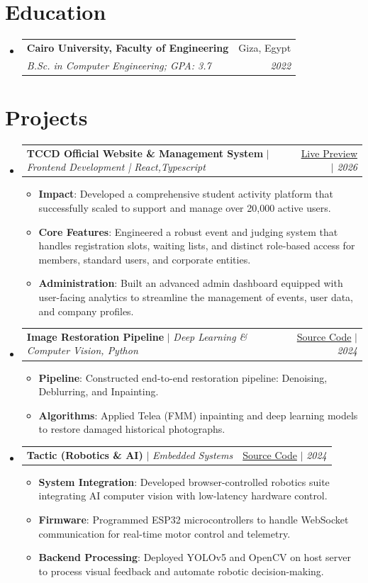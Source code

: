 \documentclass[letterpaper,10pt]{article}
\makeatletter
\newcommand{\resumeItem}[2]{\item\footnotesize{\textbf{#1}{: #2 \vspace{-3pt}}}}
\newcommand{\resumeSubheading}[4]{
  \vspace{-1pt}\item
    \begin{tabular*}{1.0\textwidth}{l@{\extracolsep{\fill}}r}
      \textbf{#1} & #2 \\
      \textit{\footnotesize#3} & \textit{\footnotesize #4} \\
    \end{tabular*}\vspace{-7pt}
}
\newcommand{\resumeProjectSubheading}[3]{
  \vspace{-1pt}\item
    \begin{tabular*}{1.0\textwidth}{l@{\extracolsep{\fill}}r}
      \textbf{#1} $|$ \textit{\footnotesize#2} & #3 \\
    \end{tabular*}\vspace{-7pt}
}
\newcommand{\resumeSubHeadingListStart}{\begin{itemize}[leftmargin=*]}
\newcommand{\resumeSubHeadingListEnd}{\end{itemize}}
\newcommand{\resumeItemListStart}{\begin{itemize}}
\newcommand{\resumeItemListEnd}{\end{itemize}\vspace{-8pt}}
\makeatother
\begin{document}
\section{Education}
  \resumeSubHeadingListStart
    \resumeSubheading
      {Cairo University, Faculty of Engineering}{Giza, Egypt}
      {B.Sc. in Computer Engineering;  GPA: 3.7}{2022}
  \resumeSubHeadingListEnd
\section{Projects}
  \resumeSubHeadingListStart
    \resumeProjectSubheading
      {TCCD Official Website \& Management System}{Frontend Development | React,Typescript}{\href{https://tccd.eng.cu.edu.eg/}{Live Preview} $|$ \textit{\small 2026}}
      \resumeItemListStart
        \resumeItem{Impact}
          {Developed a comprehensive student activity platform that successfully scaled to support and manage over 20,000 active users.}
        \resumeItem{Core Features}
          {Engineered a robust event and judging system that handles registration slots, waiting lists, and distinct role-based access for members, standard users, and corporate entities.}
        \resumeItem{Administration}
          {Built an advanced admin dashboard equipped with user-facing analytics to streamline the management of events, user data, and company profiles.}
      \resumeItemListEnd
    \vspace{1pt}
    \resumeProjectSubheading
      {Image Restoration Pipeline}{Deep Learning \& Computer Vision, Python}{\href{https://github.com/ahmedfathy0-0/Image-Colorization-of-Historical-Photos}{Source Code} $|$ \textit{\small 2024}}
      \resumeItemListStart
        \resumeItem{Pipeline}
          {Constructed end-to-end restoration pipeline: Denoising, Deblurring, and Inpainting.}
        \resumeItem{Algorithms}
          {Applied Telea (FMM) inpainting and deep learning models to restore damaged historical photographs.}
      \resumeItemListEnd
    \vspace{1pt}
    \resumeProjectSubheading
      {Tactic (Robotics \& AI)}{Embedded Systems}{\href{https://github.com/roboSobia}{Source Code} $|$ \textit{\small 2024}}
      \resumeItemListStart
        \resumeItem{System Integration}
          {Developed browser-controlled robotics suite integrating AI computer vision with low-latency hardware control.}
        \resumeItem{Firmware}
          {Programmed ESP32 microcontrollers to handle WebSocket communication for real-time motor control and telemetry.}
        \resumeItem{Backend Processing}
          {Deployed YOLOv5 and OpenCV on host server to process visual feedback and automate robotic decision-making.}
      \resumeItemListEnd
  \resumeSubHeadingListEnd
\end{document}
